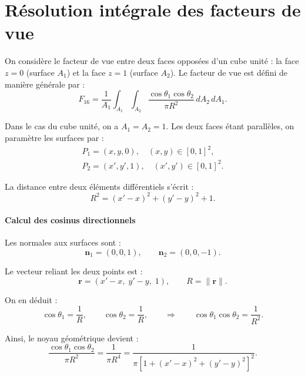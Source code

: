 \section{Résolution intégrale des facteurs de vue}
\label{method_integrale}
On considère le facteur de vue entre deux faces opposées d'un cube unité : la face $z=0$ (surface $A_1$) et la face $z=1$ (surface $A_2$). Le facteur de vue est défini de manière générale par :
\begin{equation}
F_{16}=\frac{1}{A_1}\int_{A_1}\int_{A_2}\frac{\cos\theta_1 \cos\theta_2}{\pi R^2}\, dA_2\, dA_1.
\end{equation}

Dans le cas du cube unité, on a $A_1=A_2=1$. Les deux faces étant parallèles, on paramètre les surfaces par :
\begin{align}
P_1=(x,y,0), \quad (x,y)\in[0,1]^2,\\
P_2=(x',y',1), \quad (x',y')\in[0,1]^2.
\end{align}

La distance entre deux éléments différentiels s'écrit :
\begin{equation}
R^2=(x'-x)^2+(y'-y)^2+1.
\end{equation}

\paragraph{Calcul des cosinus directionnels}

Les normales aux surfaces sont :
\begin{equation}
\mathbf n_1=(0,0,1), \qquad \mathbf n_2=(0,0,-1).
\end{equation}

Le vecteur reliant les deux points est :
\begin{equation}
\mathbf r=(x'-x,\;y'-y,\;1), \qquad R=\|\mathbf r\|.
\end{equation}

On en déduit :
\begin{equation}
\cos\theta_1=\frac{1}{R}, \qquad \cos\theta_2=\frac{1}{R}, \qquad \Rightarrow \qquad \cos\theta_1\cos\theta_2=\frac{1}{R^2}.
\end{equation}

Ainsi, le noyau géométrique devient :
\begin{equation}
\frac{\cos\theta_1 \cos\theta_2}{\pi R^2}=\frac{1}{\pi R^4}=\frac{1}{\pi\left[1+(x'-x)^2+(y'-y)^2\right]^2}.
\end{equation}

